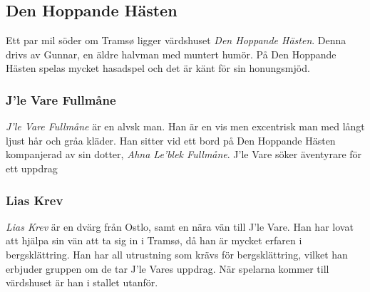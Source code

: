 \subsection{Den Hoppande Hästen}
\label{DenHoppandeHasten}
Ett par mil söder om Tramsø ligger värdshuset \textit{Den Hoppande Hästen}. Denna drivs av Gunnar, en äldre halvman med muntert humör. På Den Hoppande Hästen spelas mycket hasadspel och det är känt för sin honungsmjöd. 
\subsubsection{J'le Vare Fullmåne}
\textit{J'le Vare Fullmåne} är en alvsk man. Han är en vis men excentrisk man med långt ljust hår och gråa kläder. Han sitter vid ett bord på Den Hoppande Hästen kompanjerad av sin dotter, \textit{Ahna Le'blek Fullmåne}. J'le Vare söker äventyrare för ett uppdrag \sectiondescribe{\ref{OverTramsosVaggar}}

\subsubsection{Lias Krev}
\label{liasKrev}
\textit{Lias Krev} är en dvärg från Ostlo, samt en nära vän till J'le Vare. Han har lovat att hjälpa sin vän att ta sig in i Tramsø, då han är mycket erfaren i bergsklättring. Han har all utrustning som krävs för bergsklättring, vilket han erbjuder gruppen om de tar J'le Vares uppdrag. När spelarna kommer till värdshuset är han i stallet utanför.